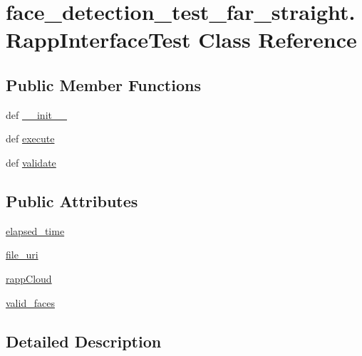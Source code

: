 \hypertarget{classface__detection__test__far__straight_1_1RappInterfaceTest}{\section{face\-\_\-detection\-\_\-test\-\_\-far\-\_\-straight.\-Rapp\-Interface\-Test Class Reference}
\label{classface__detection__test__far__straight_1_1RappInterfaceTest}
}
\subsection*{Public Member Functions}
\begin{DoxyCompactItemize}
\item 
def \hyperlink{classface__detection__test__far__straight_1_1RappInterfaceTest_adc16596e7b264d2bfc595c8f3a32c110}{\-\_\-\-\_\-init\-\_\-\-\_\-}
\item 
def \hyperlink{classface__detection__test__far__straight_1_1RappInterfaceTest_a87ac5042ca5df7bcaeda43b64537f229}{execute}
\item 
def \hyperlink{classface__detection__test__far__straight_1_1RappInterfaceTest_ab07e72663517ec5f3314551481d80f3e}{validate}
\end{DoxyCompactItemize}
\subsection*{Public Attributes}
\begin{DoxyCompactItemize}
\item 
\hyperlink{classface__detection__test__far__straight_1_1RappInterfaceTest_a332faf8acd2e7dd48af88718dff06cea}{elapsed\-\_\-time}
\item 
\hyperlink{classface__detection__test__far__straight_1_1RappInterfaceTest_a704396fb81bdf3981e4ee3e652644896}{file\-\_\-uri}
\item 
\hyperlink{classface__detection__test__far__straight_1_1RappInterfaceTest_ad72b8058707fb1b5f015e29d109674fa}{rapp\-Cloud}
\item 
\hyperlink{classface__detection__test__far__straight_1_1RappInterfaceTest_a5d1d6a84a96556e5f36d47b283174aba}{valid\-\_\-faces}
\end{DoxyCompactItemize}


\subsection{Detailed Description}


